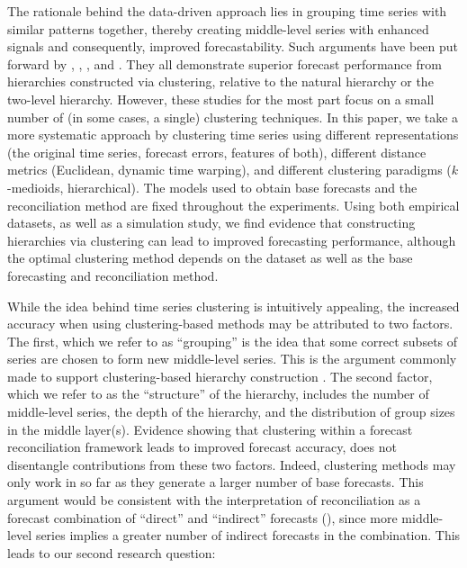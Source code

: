 \documentclass[a4paper,review,12pt,authoryear]{elsarticle}
\begin{document}
The rationale behind the data-driven approach lies in grouping time series with similar patterns together, thereby creating middle-level series with enhanced signals and consequently, improved forecastability. Such arguments have been put forward by  \cite{pangHierarchicalElectricityTime2018}, \cite{liForecastReconciliationApproach2019}, \cite{pangHierarchicalElectricityTime2022}, and \cite{matteraImprovingOutofSampleForecasts2023}. They all demonstrate superior forecast performance from hierarchies constructed via clustering, relative to the natural hierarchy or the two-level hierarchy. However, these studies for the most part focus on a small number of (in some cases, a single) clustering techniques. In this paper, we take a more systematic approach by clustering time series using different representations (the original time series, forecast errors, features of both), different distance metrics (Euclidean, dynamic time warping), and different clustering paradigms ($k$-medioids, hierarchical). The models used to obtain base forecasts and the reconciliation method are fixed throughout the experiments. Using both empirical datasets, as well as a simulation study, we find evidence that constructing hierarchies via clustering can lead to improved forecasting performance, although the optimal clustering method depends on the dataset as well as the base forecasting and reconciliation method.%

While the idea behind time series clustering is intuitively appealing, the increased accuracy when using clustering-based methods may be attributed to two factors. The first, which we refer to as     ``grouping'' is the idea that some correct subsets of series are chosen to form new middle-level series. This is the argument commonly made to support clustering-based hierarchy construction \citep[see \textit{e.g.}][]{liForecastReconciliationApproach2019, pangHierarchicalElectricityTime2022, matteraImprovingOutofSampleForecasts2023}.  
The second factor, which we refer to as the ``structure'' of the hierarchy, includes the number of middle-level series, the depth of the hierarchy, and the distribution of group sizes in the middle layer(s). Evidence showing that clustering within a forecast reconciliation framework leads to improved forecast accuracy, does not disentangle contributions from these two factors. Indeed, clustering methods may only work in so far as they generate a larger number of base forecasts. {\color{purple}This argument would be consistent with the interpretation of reconciliation as a forecast combination of ``direct'' and ``indirect'' forecasts (\citealp{hollymanUnderstandingForecastReconciliation2021, di2024forecast}), since more middle-level series implies a greater number of indirect forecasts in the combination.} This leads to our second research question:
\end{document}
